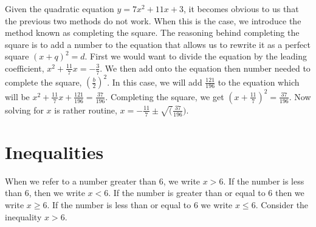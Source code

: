 \documentclass[12pt]{report}
\begin{document}

Given the quadratic equation $y=7x^2+11x+3$, it becomes obvious to us that the previous two methods do not work. When this is the case, we introduce the method known as completing the square. The reasoning behind completing the square is to add a number to the equation that allows us to rewrite it as a perfect square $(x+q)^2=d$. First we would want to divide the equation by the leading coefficient, $x^2+ \frac{11}{7}x=-\frac{3}{7}$. We then add onto the equation then number needed to complete the square, $(\frac{b}{2})^2$. In this case, we will add $\frac{121}{196}$ to the equation which will be $x^2+\frac{11}{7}x+\frac{121}{196}=\frac{37}{196}$. Completing the square, we get $(x+\frac{11}{7})^2=\frac{37}{196}$. Now solving for $x$ is rather routine, $x=-\frac{11}{7} \pm \sqrt(\frac{37}{196})$.\medskip



\section{Inequalities}

\hspace{\parindent}When we refer to a number greater than $6$, we write $x > 6$. If the number is less than 6, then we write $x < 6$. If the number is greater than or equal to 6 then we write $x \geq 6$. If the number is less than or equal to $6$ we write $x \leq 6$. Consider the inequality $x > 6$.
\end{document}

